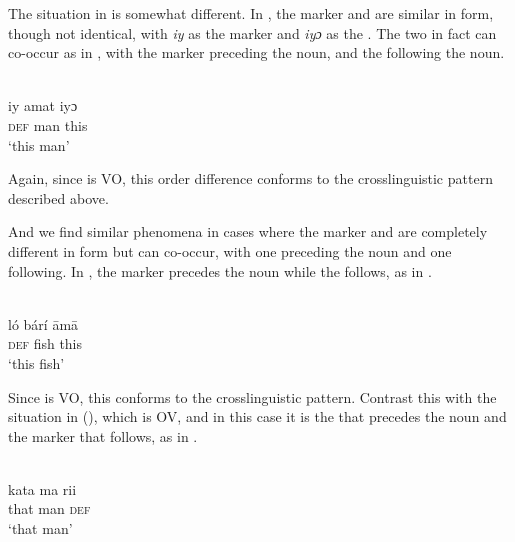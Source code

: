 \documentclass[output=paper]{langsci/langscibook}
\begin{document}
The situation in  is somewhat different. In , the  marker and  are similar in form, though not identical, with \textit{iy} as the  marker and \textit{iyɔ} as the . The two in fact can co-occur as in , with the  marker preceding the noun, and the  following the noun.

\ea\label{ex:dryer:40}
\\
\gll   iy   amat   iyɔ\\
       \textsc{def}   man   this \\
\glt   ‘this man’
\z

\noindent Again, since  is VO, this order difference conforms to the crosslinguistic pattern described above.

And we find similar phenomena in cases where the  marker and  are completely different in form but can co-occur, with one preceding the noun and one following. In , the  marker precedes the noun while the  follows, as in .

\ea\label{ex:dryer:41}
\\
\gll   ló   bárí   āmā \\
       \textsc{def}   fish   this \\
\glt   ‘this fish’
\z

\noindent Since  is VO, this conforms to the crosslinguistic pattern. Contrast this with the situation in  (), which is OV, and in this case it is the  that precedes the noun and the  marker that follows, as in .

\ea\label{ex:dryer:42}
\\
\gll   kata  ma  rii\\
       that  man  \textsc{def}\\
\glt   ‘that man’
\z
\end{document}
